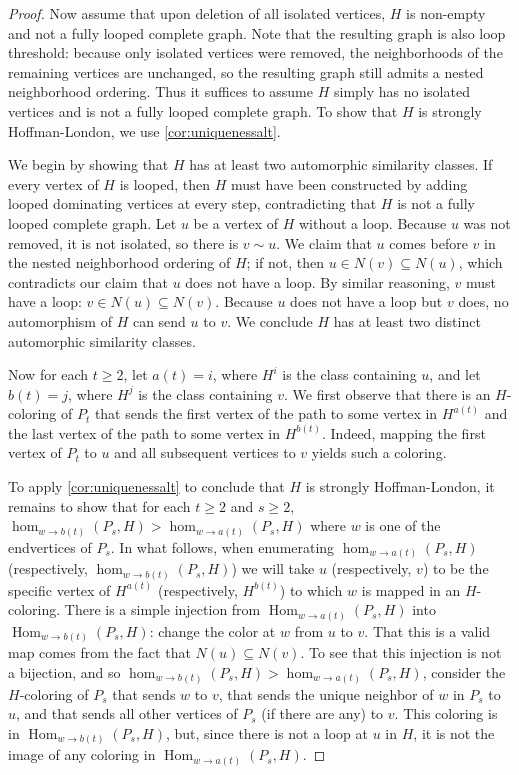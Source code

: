 \documentclass[11pt]{article}
\theoremstyle{definition}
\newcommand{\Homclass}[4]{\Hom_{#1\to#2}(#3,#4)}
\newcommand{\homclass}[4]{\hom_{#1\to#2}(#3,#4)}
\DeclareMathOperator{\Hom}{Hom}
\begin{document}
\begin{proof}
Now assume that upon deletion of all isolated vertices, $H$ is non-empty and not a fully looped complete graph. Note that the resulting graph is also loop threshold: because only isolated vertices were removed, the neighborhoods of the remaining vertices are unchanged, so the resulting graph still admits a nested neighborhood ordering. Thus it suffices to assume $H$ simply has no isolated vertices and is not a fully looped complete graph. To show that $H$ is strongly Hoffman-London, we use \cref{cor:uniquenessalt}.

We begin by showing that $H$ has at least two automorphic similarity classes. If every vertex of $H$ is looped, then $H$ must have been constructed by adding looped dominating vertices at every step, contradicting that $H$ is not a fully looped complete graph. Let $u$ be a vertex of $H$ without a loop. Because $u$ was not removed, it is not isolated, so there is $v \sim u$. We claim that $u$ comes before $v$ in the nested neighborhood ordering of $H$; if not, then $u \in N(v) \subseteq N(u)$, which contradicts our claim that $u$ does not have a loop. By similar reasoning, $v$ must have a loop: $v \in N(u) \subseteq N(v)$. Because $u$ does not have a loop but $v$ does, no automorphism of $H$ can send $u$ to $v$. We conclude $H$ has at least two distinct automorphic similarity classes.

Now for each $t \ge 2$, let $a(t)=i$, where $H^i$ is the class containing $u$, and let $b(t)=j$, where $H^j$ is the class containing $v$. We first observe that there is an $H$-coloring of $P_t$ that sends the first vertex of the path to some vertex in $H^{a(t)}$ and the last vertex of the path to some vertex in $H^{b(t)}$. Indeed, mapping the first vertex of $P_t$ to $u$ and all subsequent vertices to $v$ yields such a coloring.

To apply \cref{cor:uniquenessalt} to conclude that $H$ is strongly Hoffman-London, it remains to show that for each $t \ge 2$ and $s \ge 2$, $\homclass{w}{b(t)}{P_s}{H} > \homclass{w}{a(t)}{P_s}{H}$ where $w$ is one of the endvertices of $P_s$. In what follows, when enumerating $\homclass{w}{a(t)}{P_s}{H}$ (respectively, $\homclass{w}{b(t)}{P_s}{H}$) we will take $u$ (respectively, $v$) to be the specific vertex of $H^{a(t)}$ (respectively, $H^{b(t)}$) to which $w$ is mapped in an $H$-coloring. There is a simple injection from $\Homclass{w}{a(t)}{P_s}{H}$ into $\Homclass{w}{b(t)}{P_s}{H}$: change the color at $w$ from $u$ to $v$. That this is a valid map comes from the fact that $N(u) \subseteq N(v)$. To see that this injection is not a bijection, and so $\homclass{w}{b(t)}{P_s}{H} > \homclass{w}{a(t)}{P_s}{H}$, consider the $H$-coloring of $P_s$ that sends $w$ to $v$, that sends the unique neighbor of $w$ in $P_s$ to $u$, and that sends all other vertices of $P_s$ (if there are any) to $v$. This coloring is in $\Homclass{w}{b(t)}{P_s}{H}$, but, since there is not a loop at $u$ in $H$, it is not the image of any coloring in $\Homclass{w}{a(t)}{P_s}{H}$.
\end{proof}
\end{document}
